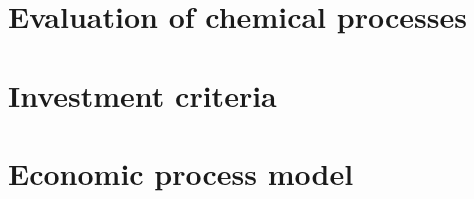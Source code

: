     \section{Evaluation of chemical processes}
    \label{sec:ProjectCost}
    

    \section{Investment criteria}
    \label{sec:InvestmentCriteria}
    

    \section{Economic process model}
    \label{sec:econprocessmodel}
    

